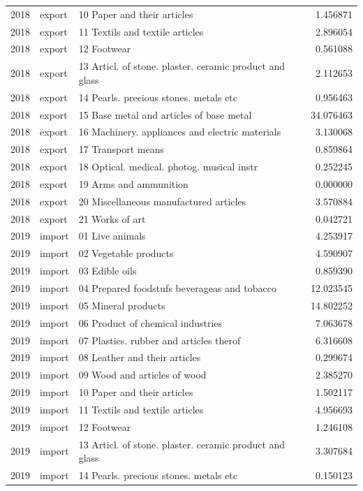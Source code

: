 \begin{tabular}{rllr}
2018 & export & 10 Paper and their articles & 1.456871 \\
2018 & export & 11 Textils and textile articles & 2.896054 \\
2018 & export & 12 Footwear & 0.561088 \\
2018 & export & 13 Articl. of stone. plaster. ceramic product and glass & 2.112653 \\
2018 & export & 14 Pearls. precious stones. metals etc & 0.956463 \\
2018 & export & 15 Base metal and articles of base metal & 34.076463 \\
2018 & export & 16 Machinery. appliances and electric materials & 3.130068 \\
2018 & export & 17 Transport means & 0.859864 \\
2018 & export & 18 Optical. medical. photog. musical instr & 0.252245 \\
2018 & export & 19 Arms and ammunition & 0.000000 \\
2018 & export & 20 Miscellaneous manufactured articles & 3.570884 \\
2018 & export & 21 Works of art & 0.042721 \\
2019 & import & 01 Live animals & 4.253917 \\
2019 & import & 02 Vegetable products & 4.590907 \\
2019 & import & 03 Edible oils & 0.859390 \\
2019 & import & 04 Prepared foodstufs beverageas and tobacco & 12.023545 \\
2019 & import & 05 Mineral products & 14.802252 \\
2019 & import & 06 Product of chemical industries & 7.063678 \\
2019 & import & 07 Plastics. rubber and articles therof & 6.316608 \\
2019 & import & 08 Leather and their articles & 0.299674 \\
2019 & import & 09 Wood and articles of wood & 2.385270 \\
2019 & import & 10 Paper and their articles & 1.502117 \\
2019 & import & 11 Textils and textile articles & 4.956693 \\
2019 & import & 12 Footwear & 1.246108 \\
2019 & import & 13 Articl. of stone. plaster. ceramic product and glass & 3.307684 \\
2019 & import & 14 Pearls. precious stones. metals etc & 0.150123 \\

\end{tabular}
